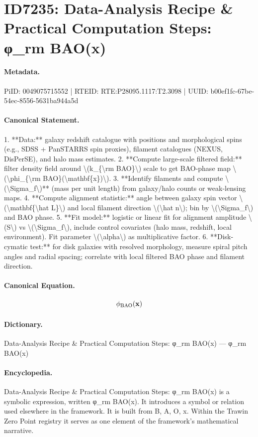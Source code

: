 \section*{ID7235: Data-Analysis Recipe \& Practical Computation Steps: φ\_rm BAO(x)}
\paragraph{Metadata.}
PiID: 0049075715552 | RTEID: RTE:P28095.1117:T2.3098 | UUID: b00ef1fc-67be-54ec-8556-5631ba944a5d

\paragraph{Canonical Statement.}
1. **Data:** galaxy redshift catalogue with positions and morphological spins (e.g., SDSS + PanSTARRS spin proxies), filament catalogues (NEXUS, DisPerSE), and halo mass estimates. 2. **Compute large-scale filtered field:** filter density field around \textbackslash{}(k\_\{\textbackslash{}rm BAO\}\textbackslash{}) scale to get BAO-phase map \textbackslash{}(\textbackslash{}phi\_\{\textbackslash{}rm BAO\}(\textbackslash{}mathbf\{x\})\textbackslash{}). 3. **Identify filaments and compute \textbackslash{}(\textbackslash{}Sigma\_f\textbackslash{})** (mass per unit length) from galaxy/halo counts or weak-lensing maps. 4. **Compute alignment statistic:** angle between galaxy spin vector \textbackslash{}(\textbackslash{}mathbf\{\textbackslash{}hat L\}\textbackslash{}) and local filament direction \textbackslash{}(\textbackslash{}hat n\textbackslash{}); bin by \textbackslash{}(\textbackslash{}Sigma\_f\textbackslash{}) and BAO phase. 5. **Fit model:** logistic or linear fit for alignment amplitude \textbackslash{}(S\textbackslash{}) vs \textbackslash{}(\textbackslash{}Sigma\_f\textbackslash{}), include control covariates (halo mass, redshift, local environment). Fit parameter \textbackslash{}(\textbackslash{}alpha\textbackslash{}) as multiplicative factor. 6. **Disk-cymatic test:** for disk galaxies with resolved morphology, measure spiral pitch angles and radial spacing; correlate with local filtered BAO phase and filament direction.

\paragraph{Canonical Equation.}
\[
\phi_{\rm BAO}(\mathbf{x})
\]

\paragraph{Dictionary.}
Data-Analysis Recipe \& Practical Computation Steps: φ\_rm BAO(x) — φ\_rm BAO(x)

\paragraph{Encyclopedia.}
Data-Analysis Recipe \& Practical Computation Steps: φ\_rm BAO(x) is a symbolic expression, written φ\_rm BAO(x). It introduces a symbol or relation used elsewhere in the framework. It is built from B, A, O, x. Within the Trawin Zero Point registry it serves as one element of the framework's mathematical narrative.
